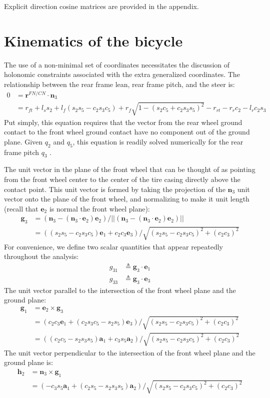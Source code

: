 \documentclass[letterpaper,11pt]{article}
\newcommand{\bs}[1]{ \boldsymbol{ #1 } }
\begin{document}
Explicit direction cosine matrices are provided in the
appendix.

\section*{Kinematics of the bicycle}
The use of a non-minimal set of coordinates necessitates the discussion of
holonomic constraints associated with the extra generalized coordinates.  The
relationship between the rear frame lean, rear frame pitch, and the steer is:
\begin{align*}
0 & =  \bs{r}^{FN/CN} \cdot \bs{n}_3 \\
  & = r_{ft} + l_s s_2 + l_f (s_2 s_5 - c_2 s_3 c_5) +
    r_f \sqrt{1 - (s_2 c_5 + c_2 s_3 s_5)^2} - r_{rt} - r_r c_2 - l_r c_2 s_3
  \label{eq:holonomic}
\end{align*}
Put simply, this equation requires that the vector from the rear wheel ground
contact to the front wheel ground contact have no component out of the ground
plane.  Given $q_2$ and $q_5$, this equation is readily solved numerically for
the rear frame pitch $q_3$ \cite{Peterson2008a}.

The unit vector in the plane of the front wheel that can be thought of as
pointing from the front wheel center to the center of the tire casing directly
above the contact point. This unit vector is formed by taking the projection of
the $\bs{n}_3$ unit vector onto the plane of the front wheel, and normalizing
to make it unit length (recall that $\bs{e}_2$ is normal the front wheel plane):
\begin{align*}
  \bs{g}_3 & = (\bs{n}_3 - (\bs{n}_3 \cdot \bs{e}_2) \bs{e}_2) / ||(\bs{n}_3 -
  (\bs{n}_3 \cdot \bs{e}_2) \bs{e}_2)|| \\
  & = ((s_2 s_5 - c_2 s_3 c_5) \bs{e}_1 + c_2 c_3 \bs{e}_3) / \sqrt{(s_2 s_5 -
  c_2 s_3 c_5)^2 + (c_2 c_3)^2}
\end{align*}
For convenience, we define two scalar quantities that appear repeatedly
throughout the analysis:
\begin{align*}
  g_{31} & \triangleq \bs{g}_3 \cdot \bs{e}_1 \\
  g_{33} & \triangleq \bs{g}_3 \cdot \bs{e}_3
\end{align*}
The unit vector parallel to the intersection of the front wheel plane and the
ground plane:
\begin{align*}
  \bs{g}_1 & = \bs{e}_2 \times \bs{g}_3 \\
  & = \left(c_2 c_3 \bs{e}_1 + (c_2 s_3 c_5 - s_2 s_5) \bs{e}_3\right) / \sqrt{(s_2 s_5 -
  c_2 s_3 c_5)^2 + (c_2 c_3)^2} \\
  & = \left((c_2 c_5 - s_2 s_3 s_5) \bs{a}_1 + c_3 s_5 \bs{a}_2\right) / \sqrt{(s_2 s_5 -
  c_2 s_3 c_5)^2 + (c_2 c_3)^2}
\end{align*}
The unit vector perpendicular to the intersection of the front wheel plane and
the ground plane is:
\begin{align*}
  \bs{h}_2 & = \bs{n}_3 \times \bs{g}_1 \\
  & = \left(-c_3 s_5 \bs{a}_1 + (c_2 s_5 - s_2 s_3 s_5) \bs{a}_2\right) / \sqrt{(s_2 s_5 -
  c_2 s_3 c_5)^2 + (c_2 c_3)^2}
\end{align*}
\end{document}
